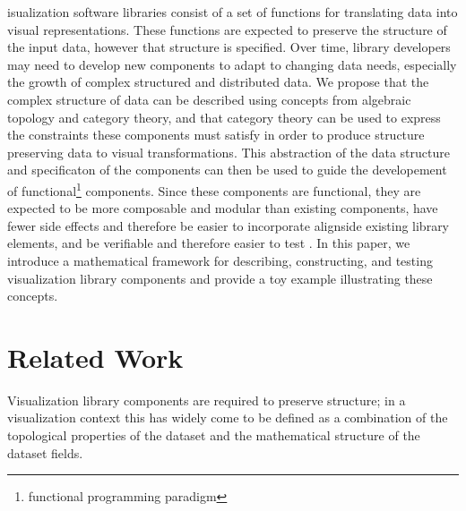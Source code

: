 \documentclass[10pt,journal,compsoc]{IEEEtran}
\theoremstyle{definition}
\theoremstyle{remark}
\begin{document}
isualization software libraries consist of a set of functions for translating data into visual representations. These functions are expected to preserve the structure of the input data, however that structure is specified. Over time, library developers may need to develop new components to adapt to changing data needs, especially the growth of complex structured and distributed data. We propose that the complex structure of data can be described using concepts from algebraic topology and category theory, and that category theory can be used to express the constraints these components must satisfy in order to produce structure preserving data to visual transformations. This abstraction of the data structure and specificaton of the components can then be used to guide the developement of functional\footnote{functional programming paradigm} components. Since these components are functional, they are expected to be more composable and modular than existing components, have fewer side effects and therefore be easier to incorporate alignside existing library elements, and be verifiable and therefore easier to test \cite{huHowFunctionalProgramming2015,hughesWhyFunctionalProgramming1989}. In this paper, we introduce a mathematical framework for describing, constructing, and testing visualization library components and provide a toy example illustrating these concepts.

\section{Related Work}
Visualization library components are required to preserve structure; in a visualization context this has widely come to be defined as a combination of the topological properties of the dataset and the mathematical structure of the dataset fields.
\end{document}
